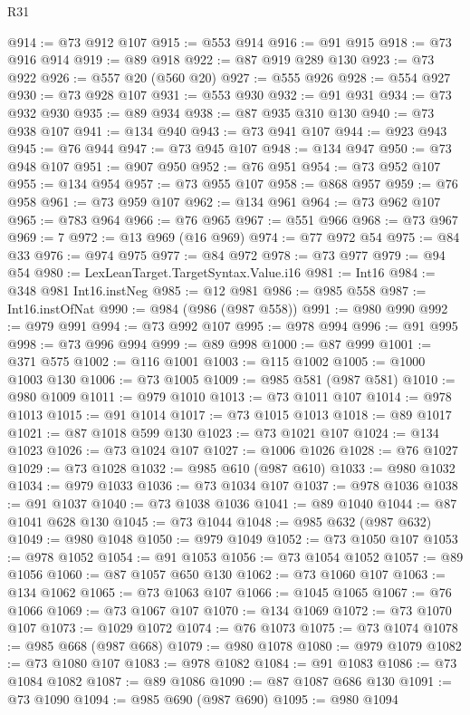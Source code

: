 \begin{lexlean}{R31}
\begin{coremodule}
@914 := @73 @912 @107
@915 := @553 @914
@916 := @91 @915
@918 := @73 @916 @914
@919 := @89 @918
@922 := @87 @919 @289 @130
@923 := @73 @922
@926 := @557 @20 (@560 @20)
@927 := @555 @926
@928 := @554 @927
@930 := @73 @928 @107
@931 := @553 @930
@932 := @91 @931
@934 := @73 @932 @930
@935 := @89 @934
@938 := @87 @935 @310 @130
@940 := @73 @938 @107
@941 := @134 @940
@943 := @73 @941 @107
@944 := @923 @943
@945 := @76 @944
@947 := @73 @945 @107
@948 := @134 @947
@950 := @73 @948 @107
@951 := @907 @950
@952 := @76 @951
@954 := @73 @952 @107
@955 := @134 @954
@957 := @73 @955 @107
@958 := @868 @957
@959 := @76 @958
@961 := @73 @959 @107
@962 := @134 @961
@964 := @73 @962 @107
@965 := @783 @964
@966 := @76 @965
@967 := @551 @966
@968 := @73 @967
@969 := 7
@972 := @13 @969 (@16 @969)
@974 := @77 @972 @54
@975 := @84 @33
@976 := @974 @975
@977 := @84 @972
@978 := @73 @977
@979 := @94 @54
@980 := LexLeanTarget.TargetSyntax.Value.i16
@981 := Int16
@984 := @348 @981 Int16.instNeg
@985 := @12 @981
@986 := @985 @558
@987 := Int16.instOfNat
@990 := @984 (@986 (@987 @558))
@991 := @980 @990
@992 := @979 @991
@994 := @73 @992 @107
@995 := @978 @994
@996 := @91 @995
@998 := @73 @996 @994
@999 := @89 @998
@1000 := @87 @999
@1001 := @371 @575
@1002 := @116 @1001
@1003 := @115 @1002
@1005 := @1000 @1003 @130
@1006 := @73 @1005
@1009 := @985 @581 (@987 @581)
@1010 := @980 @1009
@1011 := @979 @1010
@1013 := @73 @1011 @107
@1014 := @978 @1013
@1015 := @91 @1014
@1017 := @73 @1015 @1013
@1018 := @89 @1017
@1021 := @87 @1018 @599 @130
@1023 := @73 @1021 @107
@1024 := @134 @1023
@1026 := @73 @1024 @107
@1027 := @1006 @1026
@1028 := @76 @1027
@1029 := @73 @1028
@1032 := @985 @610 (@987 @610)
@1033 := @980 @1032
@1034 := @979 @1033
@1036 := @73 @1034 @107
@1037 := @978 @1036
@1038 := @91 @1037
@1040 := @73 @1038 @1036
@1041 := @89 @1040
@1044 := @87 @1041 @628 @130
@1045 := @73 @1044
@1048 := @985 @632 (@987 @632)
@1049 := @980 @1048
@1050 := @979 @1049
@1052 := @73 @1050 @107
@1053 := @978 @1052
@1054 := @91 @1053
@1056 := @73 @1054 @1052
@1057 := @89 @1056
@1060 := @87 @1057 @650 @130
@1062 := @73 @1060 @107
@1063 := @134 @1062
@1065 := @73 @1063 @107
@1066 := @1045 @1065
@1067 := @76 @1066
@1069 := @73 @1067 @107
@1070 := @134 @1069
@1072 := @73 @1070 @107
@1073 := @1029 @1072
@1074 := @76 @1073
@1075 := @73 @1074
@1078 := @985 @668 (@987 @668)
@1079 := @980 @1078
@1080 := @979 @1079
@1082 := @73 @1080 @107
@1083 := @978 @1082
@1084 := @91 @1083
@1086 := @73 @1084 @1082
@1087 := @89 @1086
@1090 := @87 @1087 @686 @130
@1091 := @73 @1090
@1094 := @985 @690 (@987 @690)
@1095 := @980 @1094

\end{coremodule}
\end{lexlean}
